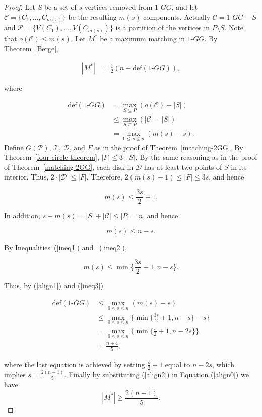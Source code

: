 \documentclass[11pt,a4paper]{article}
\newcommand{\kGG}[2]{$#1\text{-}GG#2$}
\begin{document}
\begin{proof}
Let $S$ be a set of $s$ vertices removed from \kGG{1}{}, and let $\mathcal{C}=\{C_1, \dots, C_{m(s)}\}$ be the resulting $m(s)$ components. Actually $\mathcal{C}=\text{\kGG{1}{}}-S$ and $\mathcal{P}=\{V(C_1),\dots, V(C_{m(s)})\}$ is a partition of the vertices in $P\setminus S$. Note that $o(\mathcal{C})\le m(s)$.
Let $M^*$ be a maximum matching in \kGG{1}{}. By Theorem~\ref{Berge}, 

\begin{align}
\label{align0}
|M^*|&= \frac{1}{2}(n-\text{def}(\text{\kGG{1}{}})),
\end{align}

where

\begin{align}
\label{align1}
\text{def}(\text{\kGG{1}{}})&= \max\limits_{S\subseteq P}(o(\mathcal{C})-|S|)\nonumber\\
& \le \max\limits_{S\subseteq P}(|\mathcal{C}|-|S|)\nonumber\\
& = \max\limits_{0\le s\le n}(m(s)-s).
\end{align}
Define $G(\mathcal{P})$, $\mathcal{T}$, $\mathcal{D}$, and $F$ as in the proof of Theorem~\ref{matching-2GG}. By Theorem~\ref{four-circle-theorem}, $|F|\le 3\cdot|S|$.
By the same reasoning as in the proof of Theorem~\ref{matching-2GG}, each disk in $\mathcal{D}$ has at least two points of $S$ in its interior. Thus, $2\cdot|\mathcal{D}|\le|F|$. Therefore, $2(m(s)-1)\le |F| \le 3s$, and hence

\begin{equation}
\label{ineq1}
 m(s)\le\frac{3s}{2}+1.
\end{equation} 

In addition, $s+m(s)=|S|+|\mathcal{C}|\le |P|=n$, and hence

\begin{equation}
\label{ineq2}               
m(s)\le n-s.
\end{equation}

By Inequalities~(\ref{ineq1}) and ~(\ref{ineq2}), 

\begin{equation}
\label{ineq3}               
m(s)\le \min\{\frac{3s}{2}+1, n-s\}.
\end{equation}

Thus, by (\ref{align1}) and (\ref{ineq3})

\begin{align}
\label{align2}
\text{def}(\text{\kGG{1}{}})&\le \max\limits_{0\le s\le n}(m(s)-s)\nonumber\\
&\le \max\limits_{0\le s\le n}\{\min\{\frac{3s}{2}+1, n-s\}-s\}\nonumber\\
&= \max\limits_{0\le s\le n}\{\min\{\frac{s}{2}+1, n-2s\}\}\nonumber\\
&= \frac{n+4}{5},
\end{align}

where the last equation is achieved by setting $\frac{s}{2}+1$ equal to $n-2s$, which implies $s=\frac{2(n-1)}{5}$. Finally by substituting (\ref{align2}) in Equation (\ref{align0}) we have
$$
|M^*|\ge \frac{2(n-1)}{5}.
$$
\end{proof}
\end{document}
